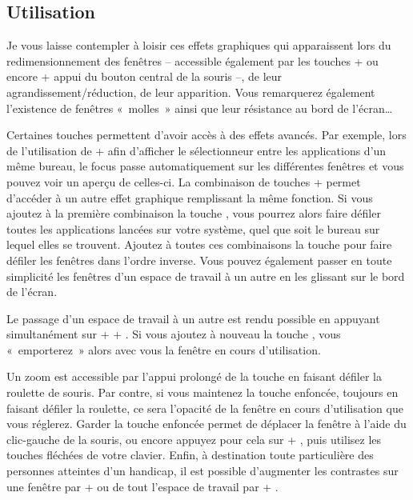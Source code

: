 \subsection{Utilisation}
Je vous laisse contempler à loisir ces effets graphiques qui apparaissent lors du redimensionnement des fenêtres -- accessible également par les touches  +  ou encore  + appui du bouton central de la souris --, de leur agrandissement/réduction, de leur apparition. Vous remarquerez également l'existence de fenêtres «~molles~» ainsi que leur résistance au bord de l'écran\ldots{}\par
Certaines touches permettent d'avoir accès à des effets avancés. Par exemple, lors de l'utilisation de  +  afin d'afficher le sélectionneur entre les applications d'un même bureau, le focus passe automatiquement sur les différentes fenêtres et vous pouvez voir un aperçu de celles-ci. La combinaison de touches  +  permet d'accéder à un autre effet graphique remplissant la même fonction. Si vous ajoutez à la première combinaison la touche , vous pourrez alors faire défiler toutes les applications lancées sur votre système, quel que soit le bureau sur lequel elles se trouvent. Ajoutez à toutes ces combinaisons la touche  pour faire défiler les fenêtres dans l'ordre inverse. Vous pouvez également passer en toute simplicité les fenêtres d'un espace de travail à un autre en les glissant sur le bord de l'écran.\par
Le passage d'un espace de travail à un autre est rendu possible en appuyant simultanément sur  +  + . Si vous ajoutez à nouveau la touche , vous «~emporterez~» alors avec vous la fenêtre en cours d'utilisation.\par
Un zoom est accessible par l'appui prolongé de la touche  en faisant défiler la roulette de souris. Par contre, si vous maintenez la touche  enfoncée, toujours en faisant défiler la roulette, ce sera l'opacité de la fenêtre en cours d'utilisation que vous réglerez. Garder la touche  enfoncée permet de déplacer la fenêtre à l'aide du clic-gauche de la souris, ou encore appuyez pour cela sur  + , puis utilisez les touches fléchées de votre clavier. Enfin, à destination toute particulière des personnes atteintes d'un handicap, il est possible d'augmenter les contrastes sur une fenêtre par  +  ou de tout l'espace de travail par  + .\par
